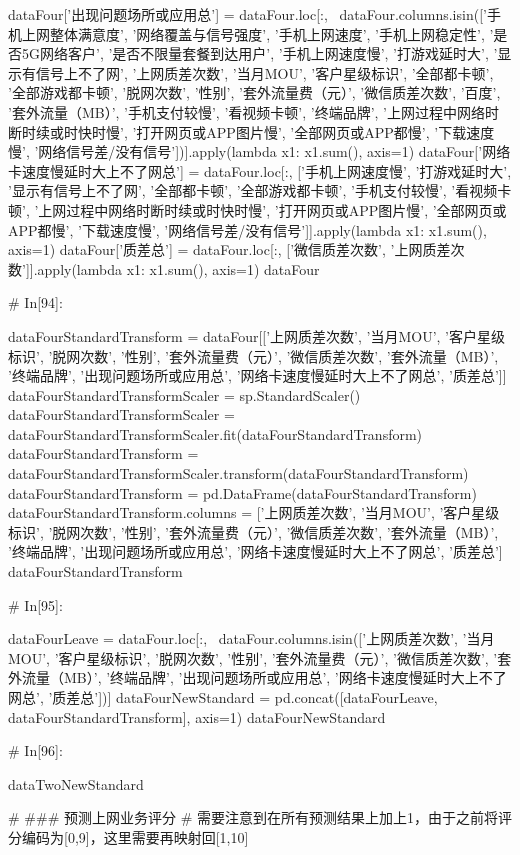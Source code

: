 \documentclass{MathorCupmodeling}
\begin{document}
\begin{python}
	
	dataFour['出现问题场所或应用总'] = dataFour.loc[:, ~dataFour.columns.isin(['手机上网整体满意度', '网络覆盖与信号强度', '手机上网速度', '手机上网稳定性', '是否5G网络客户', '是否不限量套餐到达用户', '手机上网速度慢', '打游戏延时大', '显示有信号上不了网', '上网质差次数', '当月MOU', '客户星级标识', '全部都卡顿', '全部游戏都卡顿', '脱网次数', '性别', '套外流量费（元）', '微信质差次数', '百度', '套外流量（MB）', '手机支付较慢', '看视频卡顿', '终端品牌', '上网过程中网络时断时续或时快时慢', '打开网页或APP图片慢', '全部网页或APP都慢', '下载速度慢', '网络信号差/没有信号'])].apply(lambda x1: x1.sum(), axis=1)
	dataFour['网络卡速度慢延时大上不了网总'] = dataFour.loc[:, ['手机上网速度慢', '打游戏延时大', '显示有信号上不了网', '全部都卡顿', '全部游戏都卡顿', '手机支付较慢', '看视频卡顿', '上网过程中网络时断时续或时快时慢', '打开网页或APP图片慢', '全部网页或APP都慢', '下载速度慢', '网络信号差/没有信号']].apply(lambda x1: x1.sum(), axis=1)
	dataFour['质差总'] = dataFour.loc[:, ['微信质差次数', '上网质差次数']].apply(lambda x1: x1.sum(), axis=1)
	dataFour
	
	# In[94]:
	
	
	dataFourStandardTransform = dataFour[['上网质差次数', '当月MOU', '客户星级标识', '脱网次数', '性别', '套外流量费（元）', '微信质差次数', '套外流量（MB）', '终端品牌', '出现问题场所或应用总', '网络卡速度慢延时大上不了网总', '质差总']]
	dataFourStandardTransformScaler = sp.StandardScaler()
	dataFourStandardTransformScaler = dataFourStandardTransformScaler.fit(dataFourStandardTransform)
	dataFourStandardTransform = dataFourStandardTransformScaler.transform(dataFourStandardTransform)
	dataFourStandardTransform = pd.DataFrame(dataFourStandardTransform)
	dataFourStandardTransform.columns = ['上网质差次数', '当月MOU', '客户星级标识', '脱网次数', '性别', '套外流量费（元）', '微信质差次数', '套外流量（MB）', '终端品牌', '出现问题场所或应用总', '网络卡速度慢延时大上不了网总', '质差总']
	dataFourStandardTransform
	
	# In[95]:
	
	
	dataFourLeave = dataFour.loc[:, ~dataFour.columns.isin(['上网质差次数', '当月MOU', '客户星级标识', '脱网次数', '性别', '套外流量费（元）', '微信质差次数', '套外流量（MB）', '终端品牌', '出现问题场所或应用总', '网络卡速度慢延时大上不了网总', '质差总'])]
	dataFourNewStandard = pd.concat([dataFourLeave, dataFourStandardTransform], axis=1)
	dataFourNewStandard
	
	# In[96]:
	
	
	dataTwoNewStandard
	
	# ### 预测上网业务评分
	# 需要注意到在所有预测结果上加上1，由于之前将评分编码为[0,9]，这里需要再映射回[1,10]
	

\end{python}
\end{document}
